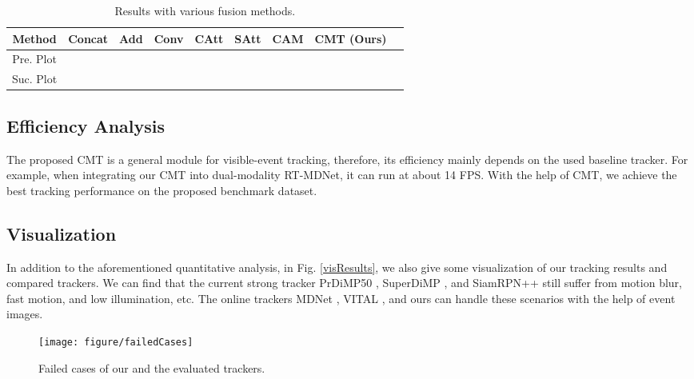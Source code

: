 \documentclass[journal]{IEEEtran}
\begin{document}
\begin{table}[!htp]
\center
\tiny 
\caption{Results with various fusion methods.} \label{FusionAnalysis} 
\begin{tabular}{c|cccccccc}  
\hline \toprule [0.5 pt] 
Method 		&Concat  			&Add 			& Conv 	  	&CAtt				&SAtt 		 &CAM  &CMT (Ours) \\
\hline 
Pre. Plot 		&				& 	& 						&   		 &   	 		&	   &   \\
Suc. Plot 		&				& 	& 						&   		 &   	 		&    &	 \\
\hline \toprule [0.5 pt]
\end{tabular}
\end{table} 





\subsection{Efficiency Analysis} 
The proposed CMT is a general module for visible-event tracking, therefore, its efficiency mainly depends on the used baseline tracker. For example, when integrating our CMT into dual-modality RT-MDNet, it can run at about 14 FPS. With the help of CMT, we achieve the best tracking performance on the proposed benchmark dataset. 


 

\subsection{Visualization} 
In addition to the aforementioned quantitative analysis, in Fig. \ref{visResults}, we also give some visualization of our tracking results and compared trackers. We can find that the current strong tracker PrDiMP50 \cite{danelljan2020PRDiMP}, SuperDiMP \cite{bhat2019DiMP}, and SiamRPN++ \cite{li2018siamrpn++} still suffer from motion blur, fast motion, and low illumination, etc. The online trackers MDNet \cite{Nam2015Learning}, VITAL \cite{song2018vital}, and ours can handle these scenarios with the help of event images. 


\begin{figure} 
\center
\texttt{[image: figure/failedCases]}
\caption{Failed cases of our and the evaluated trackers.}   
\label{failedCases}
\end{figure} 
\end{document}
